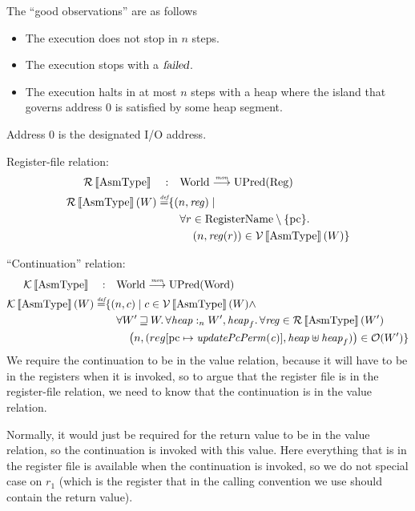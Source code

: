 \documentclass{article}
\newcommand{\update}[2]{[#1 \mapsto #2]}
\newcommand{\sem}[1]{\left\llbracket #1 \right\rrbracket}
\newcommand{\monfun}{\stackrel{\textit{\tiny{mon}}}{\longrightarrow}}
\newcommand{\defeq}{\stackrel{\textit{\tiny{def}}}{=}}
\newcommand{\var}[1]{\mathit{#1}}
\newcommand{\pcreg}{\mathrm{pc}}
\newcommand{\reg}{\var{reg}}
\newcommand{\heap}{\var{heap}}
\newcommand{\failed}{\textsl{failed}}
\newcommand{\plainfun}[1]{\mathit{#1}}
\newcommand{\updatePcPerm}[1]{\plainfun{updatePcPerm}(#1)}
\newcommand{\future}{\mathbin{\sqsupseteq}}
\newcommand{\heapSat}[3][\heap]{#1 :_{#2} #3}
\newcommand{\asmType}{\plaindom{AsmType}}
\newcommand{\plaindom}[1]{\mathrm{#1}}
\newcommand{\Words}{\plaindom{Word}}
\newcommand{\RegName}{\plaindom{RegisterName}}
\newcommand{\Regs}{\plaindom{Reg}}
\newcommand{\Worlds}{\plaindom{World}}
\newcommand{\UPred}[1]{\plaindom{UPred}(#1)}
\newcommand{\intr}[2]{\mathcal{#1}\sem{#2}}
\newcommand{\valueintr}[1]{\intr{V}{#1}}
\newcommand{\contintr}[1]{\intr{K}{#1}}
\newcommand{\regintr}[1]{\intr{R}{#1}}
\newcommand{\stdvr}{\valueintr{\asmType}}
\newcommand{\stdrr}{\regintr{\asmType}}
\newcommand{\stdkr}{\contintr{\asmType}}
\newcommand{\observations}{\mathcal{O}}
\newcommand{\npair}[2][n]{\left(#1,#2 \right)}
\begin{document}
The ``good observations'' are as follows
\begin{itemize}
\item The execution does not stop in $n$ steps. 
\item The execution stops with a $\failed$.
\item The execution halts in at most $n$ steps with a heap where the island that governs address 0 is satisfied by some heap segment.
\end{itemize}
Address 0 is the designated I/O address.

Register-file relation:
\begin{align*}
  \stdrr \quad : & \quad \Worlds \monfun \UPred{\Regs} \\
  \stdrr(W) \defeq & \{ \npair{\reg} \mid \\
                    & \quad \forall r \in \RegName \setminus \{\pcreg\} \ldotp \\
                    & \qquad  \npair{\reg(r)} \in \stdvr(W) \}
\end{align*}

``Continuation'' relation:
\begin{align*}
  \stdkr \quad : & \quad  \Worlds \monfun \UPred{\Words} \\%
  \stdkr(W) \defeq & \{ \npair{c} \mid c \in \stdvr(W) \land \\
                   & \quad  \forall W' \future W\ldotp %
                     \forall \heapSat{n}{W'}, \heap_f \ldotp \forall \reg \in \stdrr(W') \\
                   & \qquad \npair{(reg\update{\pcreg}{\updatePcPerm{\var{c}}}, \heap \uplus \heap_f)} \in \observations(W') \}
\end{align*}
We require the continuation to be in the value relation, because it will have to be in the registers when it is invoked, so to argue that the register file is in the register-file relation, we need to know that the continuation is in the value relation.

Normally, it would just be required for the return value to be in the value relation, so the continuation is invoked with this value. Here everything that is in the register file is available when the continuation is invoked, so we do not special case on $r_1$ (which is the register that in the calling convention we use should contain the return value). 
\end{document}
